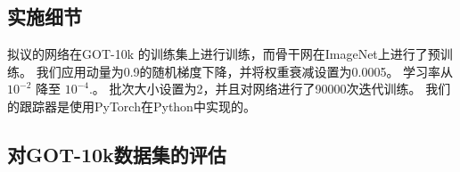 \subsection{实施细节}
拟议的网络在GOT-10k \cite{GOT-10k} 的训练集上进行训练，而骨干网在ImageNet上进行了预训练。
我们应用动量​​为0.9的随机梯度下降，并将权重衰减设置为0.0005。
学习率从 $10^{-2}$ 降至 $10^{-4}$.。
批次大小设置为2，并且对网络进行了90000次迭代训练。
我们的跟踪器是使用PyTorch在Python中实现的。
\subsection{对GOT-10k数据集的评估}


